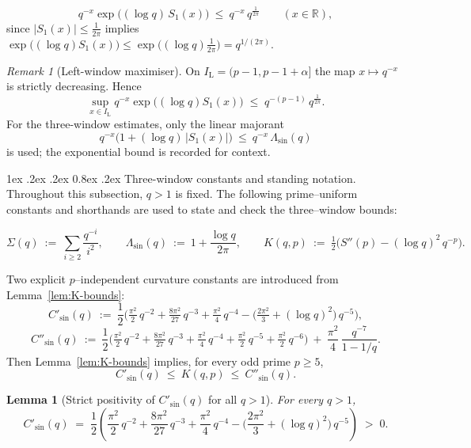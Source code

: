 \documentclass[11pt,a4paper]{amsart}
\makeatletter
\renewcommand\paragraph{\@startsection{paragraph}{4}{\z@}%
  {1ex \@plus .2ex \@minus .2ex}%
  {0.8ex \@plus .2ex}%
  {\normalfont\bfseries}}
\theoremstyle{plain}
\newtheorem{lemma}[theorem]{Lemma}
\theoremstyle{definition}
\theoremstyle{remark}
\newtheorem{remark}[theorem]{Remark}
\makeatother
\begin{document}
\begin{equation}\label{eq:corrector-exp-bound}
q^{-x}\exp\!\bigl((\log q)\,S_1(x)\bigr)\ \le\ q^{-x}\,q^{\frac{1}{2\pi}}\qquad(x\in\mathbb R),
\end{equation}
since $|S_1(x)|\le \frac{1}{2\pi}$ implies $\exp\big((\log q)S_1(x)\big)\le \exp\big((\log q)\frac1{2\pi}\big)=q^{1/(2\pi)}$.

\begin{remark}[Left-window maximiser]
On $I_{\mathrm L}=(p-1,p-1+\alpha]$ the map $x\mapsto q^{-x}$ is strictly decreasing. Hence
\[
\sup_{x\in I_{\mathrm L}} q^{-x}\exp\!\bigl((\log q)S_1(x)\bigr)
\;\le\; q^{-(p-1)}\,q^{\frac{1}{2\pi}}.
\]
For the three-window estimates, only the linear majorant
\[
q^{-x}\bigl(1+(\log q)\,|S_1(x)|\bigr)\ \le\ q^{-x}\,\Lambda_{\sin}(q)
\]
is used; the exponential bound is recorded for context.
\end{remark}

\paragraph{Three-window constants and standing notation.}
Throughout this subsection, $q>1$ is fixed. The following prime–uniform constants and shorthands are used to state and check the three–window bounds:

\[
\Sigma(q)\ :=\ \sum_{i\ge2}\frac{q^{-i}}{i^2},
\qquad
\Lambda_{\sin}(q)\ :=\ 1+\frac{\log q}{2\pi},
\qquad
K(q,p)\ :=\ \tfrac12\Big(S''(p)-(\log q)^2\,q^{-p}\Big).
\]

Two explicit $p$–independent curvature constants are introduced from Lemma~\ref{lem:K-bounds}:
\[
C'_{\sin}(q)\ :=\ \frac{1}{2}\Big(\tfrac{\pi^2}{2}\,q^{-2}+\tfrac{8\pi^2}{27}\,q^{-3}+\tfrac{\pi^2}{4}\,q^{-4}-\big(\tfrac{2\pi^2}{3}+(\log q)^2\big)\,q^{-5}\Big),
\]
\[
C''_{\sin}(q)\ :=\ \frac{1}{2}\Big(\tfrac{\pi^2}{2}\,q^{-2}+\tfrac{8\pi^2}{27}\,q^{-3}+\tfrac{\pi^2}{4}\,q^{-4}+\tfrac{\pi^2}{2}\,q^{-5}+\tfrac{\pi^2}{2}\,q^{-6}\Big)\ +\ \frac{\pi^2}{4}\,\frac{q^{-7}}{1-1/q}.
\]
Then Lemma~\ref{lem:K-bounds} implies, for every odd prime $p\ge5$,
\[
C'_{\sin}(q)\ \le\ K(q,p)\ \le\ C''_{\sin}(q).
\]

\begin{lemma}[Strict positivity of $C'_{\sin}(q)$ for all $q>1$]\label{lem:Csin-positive}
For every $q>1$,
\[
C'_{\sin}(q)\;=\;\frac12\!\left(\frac{\pi^2}{2}\,q^{-2}+\frac{8\pi^2}{27}\,q^{-3}+\frac{\pi^2}{4}\,q^{-4}-\Big(\frac{2\pi^2}{3}+(\log q)^2\Big)\,q^{-5}\right)\;>\;0.
\]
\end{lemma}
\end{document}
